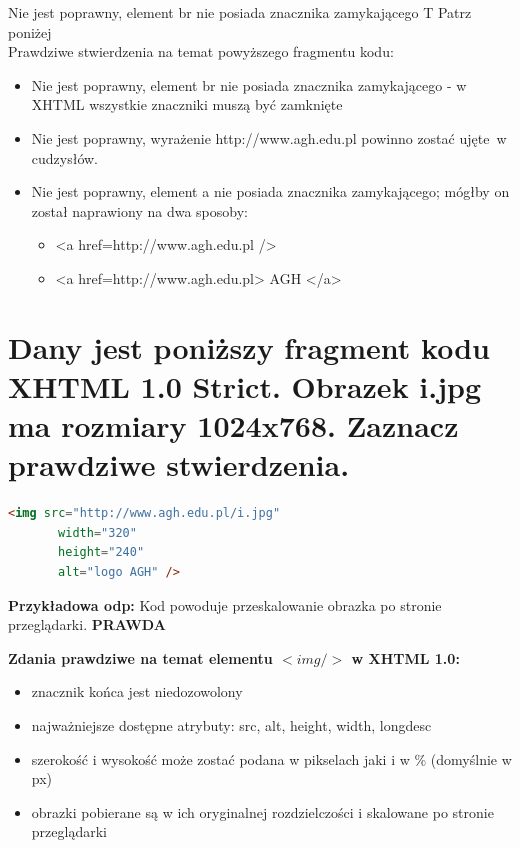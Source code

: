 \vspace{0.4cm}
\noindent
{Nie jest poprawny, element br nie posiada znacznika zamykającego}
{T}
{Patrz poniżej}
{\\}
\noindent
Prawdziwe stwierdzenia na temat powyższego fragmentu kodu:
\begin{itemize}
\item Nie jest poprawny, element br nie posiada znacznika zamykającego - w XHTML wszystkie znaczniki muszą być zamknięte
\item Nie jest poprawny, wyrażenie  http://www.agh.edu.pl  powinno zostać ujęte~w cudzysłów.  
\item Nie jest poprawny, element a nie posiada znacznika zamykającego; mógłby on został naprawiony na dwa sposoby:
	\begin{itemize}
    \item <a href=http://www.agh.edu.pl />
    \item <a href=http://www.agh.edu.pl> AGH </a>
    \end{itemize}
\end{itemize}



\vspace{0.4cm}
\noindent

\section{Dany jest poniższy fragment kodu XHTML 1.0 Strict. Obrazek i.jpg ma rozmiary 1024x768. Zaznacz prawdziwe stwierdzenia.}
\begin{lstlisting}[language=html,frame=single]
  <img src="http://www.agh.edu.pl/i.jpg"
       width="320"
       height="240"
       alt="logo AGH" />
\end{lstlisting}
\textbf{Przykładowa odp:} Kod powoduje przeskalowanie obrazka po stronie przeglądarki. \textbf{PRAWDA}


\vspace{0.2cm}
\noindent
\textbf{Zdania prawdziwe na temat elementu $<img />$ w XHTML 1.0:}
\begin{itemize}
\item znacznik końca jest niedozowolony
\item najważniejsze dostępne atrybuty: src, alt, height, width, longdesc
\item szerokość i wysokość może zostać podana w pikselach jaki i w $\%$ (domyślnie w px)
\item obrazki pobierane są w ich oryginalnej rozdzielczości i skalowane po stronie przeglądarki
\end{itemize}

